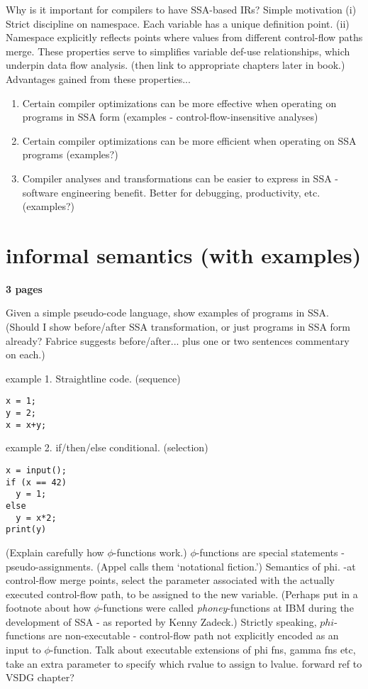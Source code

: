 Why is it important for compilers to have SSA-based IRs? Simple motivation
(i) Strict discipline on namespace. 
Each variable has a unique definition point.
(ii) Namespace explicitly reflects points where values from
different control-flow paths merge. 
These properties serve to simplifies variable def-use relationships,
which underpin data flow analysis.
(then link to appropriate chapters later in book.)
Advantages gained from these properties...
\begin{enumerate}
\item Certain compiler optimizations can be more effective
when operating on programs in SSA form
(examples - control-flow-insensitive
analyses)
\item Certain compiler optimizations can be more efficient
when operating on SSA programs (examples?) 
\item Compiler analyses and transformations can be easier
to express in SSA - software engineering benefit. Better
for debugging, productivity, etc. (examples?)
\end{enumerate}



\section{informal semantics (with examples)}

\textbf{3 pages}

Given a simple pseudo-code language, show examples of programs in SSA.
(Should I show before/after SSA transformation, or just programs
in SSA form already? Fabrice suggests before/after... plus
one or two sentences commentary on each.)

example 1. Straightline code. (sequence)

\begin{verbatim}
x = 1;
y = 2;
x = x+y;
\end{verbatim}

example 2. if/then/else conditional.  (selection)

\begin{verbatim}
x = input();
if (x == 42)
  y = 1;
else
  y = x*2;
print(y)
\end{verbatim}

(Explain carefully how $\phi$-functions work.) 
$\phi$-functions are special statements - pseudo-assignments.
(Appel calls them `notational fiction.')
Semantics of phi. -at control-flow merge points,
select the parameter associated with the actually executed
control-flow path, to be assigned to the new variable.
(Perhaps put in a footnote about how $\phi$-functions were
called \textit{phoney}-functions at IBM during the development
of SSA - as reported by Kenny Zadeck.)
Strictly speaking, $phi$-functions are non-executable - control-flow
path not explicitly encoded as an input to $\phi$-function.
Talk about executable extensions of phi fns, gamma fns etc,
take an extra parameter to specify which rvalue to assign to
lvalue.
forward ref to VSDG chapter?

